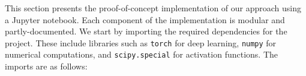 \documentclass[english]{article}
\begin{document}








This section presents the proof-of-concept implementation of our approach using a Jupyter notebook. Each component of the implementation is modular and partly-documented. We start by importing the required dependencies for the project. These include libraries such as \texttt{torch} for deep learning, \texttt{numpy} for numerical computations, and \texttt{scipy.special} for activation functions. The imports are as follows:
\end{document}
